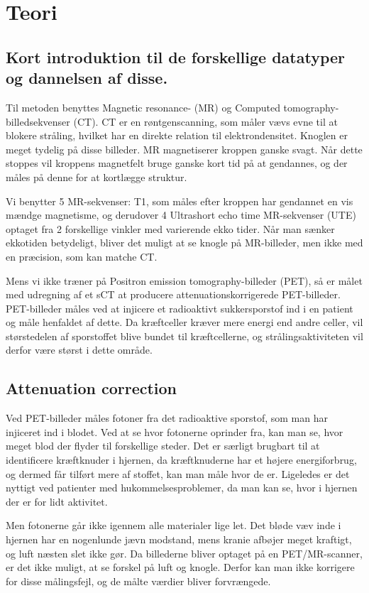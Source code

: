 \section{Teori}
\subsection{Kort introduktion til de forskellige datatyper og dannelsen af disse.}


Til metoden benyttes Magnetic resonance- (MR) og Computed
tomography-billedsekvenser (CT). CT er en røntgenscanning, som måler
vævs evne til at blokere stråling, hvilket har en direkte relation
til elektrondensitet. Knoglen er meget tydelig på disse billeder. MR
magnetiserer kroppen ganske svagt. Når dette stoppes vil kroppens
magnetfelt bruge ganske kort tid på at gendannes, og der måles på
denne for at kortlægge struktur.

Vi benytter 5 MR-sekvenser: T1, som måles efter kroppen har gendannet en vis
mændge magnetisme, og derudover 4 Ultrashort echo time MR-sekvenser (UTE)
optaget fra 2 forskellige vinkler med varierende ekko tider. Når man sænker ekkotiden betydeligt, bliver det muligt at se knogle på MR-billeder, men ikke med
en præcision, som kan matche CT.

Mens vi ikke træner på Positron emission tomography-billeder (PET), så
er målet med udregning af et sCT at producere attenuationskorrigerede
PET-billeder. PET-billeder måles ved at injicere et radioaktivt
sukkersporstof ind i en patient og måle henfaldet af dette. Da
kræftceller kræver mere energi end andre celler, vil størstedelen af
sporstoffet blive bundet til kræftcellerne, og strålingsaktiviteten
vil derfor være størst i dette område.

\subsection{Attenuation correction} 

Ved PET-billeder måles fotoner fra det radioaktive sporstof, som man
har injiceret ind i blodet. Ved at se hvor fotonerne oprinder fra, kan
man se, hvor meget blod der flyder til forskellige steder. Det er særligt
brugbart til at identificere kræftknuder i hjernen, da kræftknuderne har
et højere energiforbrug, og dermed får tilført mere af stoffet, kan
man måle hvor de er. Ligeledes er det nyttigt ved patienter med
hukommelsesproblemer, da man kan se, hvor i hjernen der er for lidt
aktivitet.

Men fotonerne går ikke igennem alle materialer lige let. Det bløde væv
inde i hjernen har en nogenlunde jævn modstand, mens kranie afbøjer
meget kraftigt, og luft næsten slet ikke gør. Da billederne bliver
optaget på en PET/MR-scanner, er det ikke muligt, at se forskel på luft
og knogle. Derfor kan man ikke korrigere for disse målingsfejl, og de
målte værdier bliver forvrængede.

